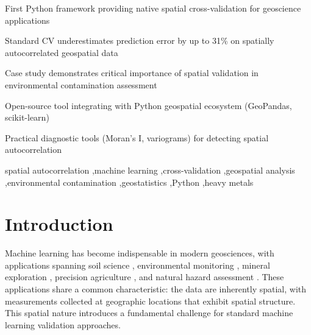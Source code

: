 \documentclass[review,12pt]{elsarticle}
\begin{document}
\begin{frontmatter}

\begin{highlights}
\item First Python framework providing native spatial cross-validation for geoscience applications
\item Standard CV underestimates prediction error by up to 31\% on spatially autocorrelated geospatial data
\item Case study demonstrates critical importance of spatial validation in environmental contamination assessment
\item Open-source tool integrating with Python geospatial ecosystem (GeoPandas, scikit-learn)
\item Practical diagnostic tools (Moran's I, variograms) for detecting spatial autocorrelation
\end{highlights}

\begin{keyword}
spatial autocorrelation \sep machine learning \sep cross-validation \sep geospatial analysis \sep environmental contamination \sep geostatistics \sep Python \sep heavy metals
\end{keyword}

\end{frontmatter}


\section{Introduction}\label{sec:intro}

Machine learning has become indispensable in modern geosciences, with applications spanning soil science \citep{hengl2018random}, environmental monitoring \citep{rodriguez2018machine}, mineral exploration \citep{zuo2019machine}, precision agriculture \citep{liakos2018machine}, and natural hazard assessment \citep{reichenbach2018review}. These applications share a common characteristic: the data are inherently spatial, with measurements collected at geographic locations that exhibit spatial structure. This spatial nature introduces a fundamental challenge for standard machine learning validation approaches.
\end{document}
